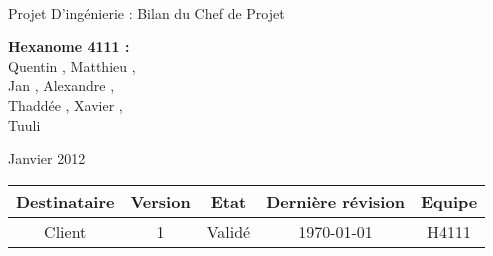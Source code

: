 \documentclass[a4paper]{article}
\begin{document}
\begin{titlepage}
~ 
\vfill
	\begin{center}
		\begin{Huge}
		Projet D'ingénierie : Bilan du Chef de Projet\\
		\end{Huge} 
\vfill
		\textbf{Hexanome 4111 :} 
		\\Quentin {}, Matthieu , 
		\\Jan {}, Alexandre , 
		\\Thaddée , Xavier ,
		\\Tuuli {}
\vfill		
		\begin{Large}
		Janvier 2012
		\end{Large}
\vfill
	\begin{tabular}{|c|c|c|c|c|}
 	 \hline
   Destinataire & Version & Etat & Dernière révision & Equipe \\
   \hline
   Client & 1 & Validé & \today & H4111 \\
   \hline
	\end{tabular}
	\end{center}
\vfill
\end{titlepage}


\end{document}
